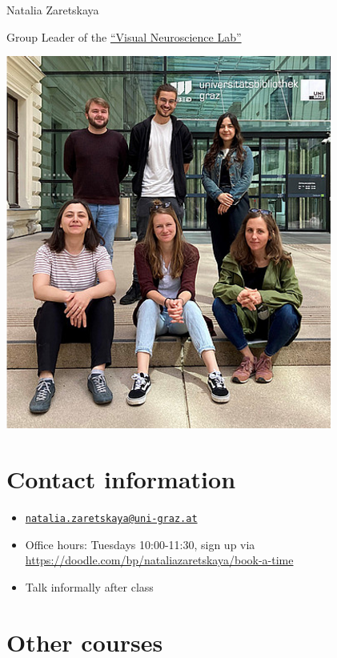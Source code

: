 \documentclass[
  letterpaper,
]{report}
\providecommand{\tightlist}{%
  \setlength{\itemsep}{0pt}\setlength{\parskip}{0pt}}\usepackage{longtable,booktabs,array}
\begin{document}

Natalia Zaretskaya

Group Leader of the \href{https://neurovision.uni-graz.at/en/}{``Visual
Neuroscience Lab''}

\includegraphics[width=4.21875in,height=\textheight,keepaspectratio]{images/clipboard-890498128.png}

\section*{Contact information}\label{contact-information}


\begin{itemize}
\tightlist
\item
  \href{mailto:natalia.zaretskaya@uni-graz.at}{\nolinkurl{natalia.zaretskaya@uni-graz.at}}
\item
  Office hours: Tuesdays 10:00-11:30, sign up via
  \url{https://doodle.com/bp/nataliazaretskaya/book-a-time}
\item
  Talk informally after class
\end{itemize}

\section*{Other courses}\label{other-courses}
\end{document}
